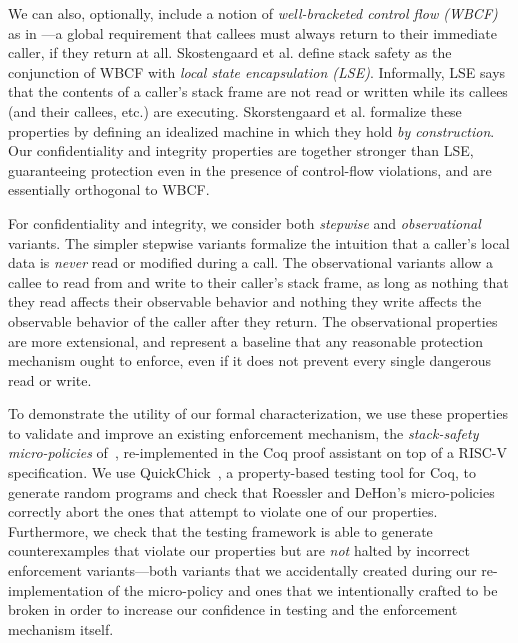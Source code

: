 \documentclass[acmsmall,review,anonymous]{acmart}\settopmatter{printfolios=true,printccs=false,printacmref=false}
\begin{document}
We can also, optionally, include a notion of {\em well-bracketed control
flow (WBCF)} as in \citet{SkorstengaardSTKJFP}---a global requirement that
callees must always return to their immediate caller, if they return
at all. Skostengaard et al. define stack safety as the conjunction of WBCF with
{\em local state encapsulation (LSE)}.
Informally, LSE says that the contents of
a caller's stack frame are not read or written while its callees (and their callees, etc.) are
executing.
Skorstengaard et al. formalize these properties by defining an idealized
machine in which they hold {\em by construction}. Our confidentiality and
integrity properties are together stronger than LSE, guaranteeing protection even
in the presence of control-flow violations, and are essentially orthogonal to WBCF.

For confidentiality and integrity, we consider both {\em stepwise}
and {\em observational} variants.  The simpler stepwise
variants formalize the intuition that a caller's local data is {\em never}
read or modified during a call. The observational variants
allow a callee to read from and write to their caller's stack frame, as
long as nothing that they read affects their observable behavior and nothing
they write affects the observable behavior of the caller after they return.
The observational properties are more extensional, and represent a baseline
that any reasonable protection mechanism ought to enforce,
even if it does not prevent every single dangerous read or write.

To demonstrate the utility of our formal characterization, we use these
properties to validate and improve an existing enforcement mechanism, the
{\em stack-safety micro-policies} of~\citet{DBLP:conf/sp/RoesslerD18}, re-implemented
in the Coq proof assistant on top of a RISC-V specification.  We
use QuickChick~\citep{Denes:VSL2014,Pierce:SF4}, a property-based testing
tool for Coq, to generate random programs and check
that Roessler and DeHon's micro-policies correctly abort the ones that
attempt to violate one of our properties. Furthermore, we
%
check that the testing framework is able to generate counterexamples
that violate our properties but are \emph{not} halted by incorrect
enforcement variants---both variants that we accidentally created
during our re-implementation of the micro-policy and ones that we
intentionally crafted to be broken in order to increase our confidence
in testing and the enforcement mechanism itself.
\end{document}
